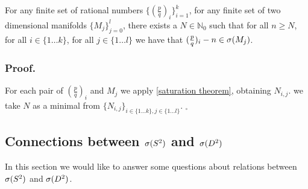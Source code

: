 \begin{corollary}\label{Saturation theorem corollary}
For any finite set of rational numbers $\{(\frac{p}{q})_i\}_{i=1}^k$, for any 
finite set of two dimensional manifolds $\{M_j\}_{j=0}^l$, there exists 
a $N\in\mathbb{N}_0$ such that 
for all $n \geq N$, for all $i\in \{1 \dots k\}$, 
for all $j\in\{1\dots l\}$ we have that  $(\frac{p}{q})_i - n \in {{\sigma}(M_j)}$.
\end{corollary}
\subsubsection{Proof.}
For each pair of $(\frac{p}{q})_i$ and $M_j$ we apply \ref{saturation theorem}, 
obtaining $N_{i,j}$. 
we take $N$ as a minimal from $\{N_{i,j}\}_{i\in\{1\dots k\}, j\in \{1\dots l\}}$. $_\square$ 

\subsection{Connections between ${{\sigma}(S^2)}$ and ${{\sigma}(D^2)}$}\label{D_and_S}
In this section we would like to 
answer some questions about 
relations between ${{\sigma}(S^2)}$ and ${{\sigma}(D^2)}$. 

